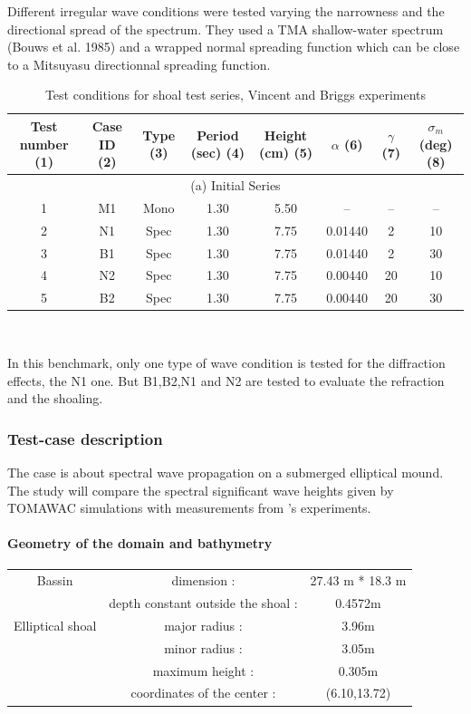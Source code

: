 Different irregular wave conditions were tested varying the narrowness and the directional spread of the spectrum. They used a TMA shallow-water spectrum (Bouws et al. 1985) and a wrapped normal spreading function which can be close to a Mitsuyasu directionnal spreading function.\\
\begin{table}

\begin{tabular}{|c|c|c|c|c|c|c|c|}
\hline
\hline
Test number (1) & Case ID (2) & Type (3) & Period (sec) (4) & Height (cm) (5) & $\alpha$ (6) & $\gamma$ (7) & $\sigma _m$ (deg) (8) \\
\hline
\multicolumn{8}{|c|}{(a) Initial Series}\\
\hline
1 & M1 & Mono & 1.30 & 5.50 & -- & -- & -- \\
2 & N1 & Spec & 1.30 & 7.75 & 0.01440 & 2 & 10\\
3 & B1 & Spec & 1.30 & 7.75 & 0.01440 & 2 & 30\\
4 & N2 & Spec & 1.30 & 7.75 & 0.00440 & 20 & 10\\
5 & B2 & Spec & 1.30 & 7.75 & 0.00440 & 20 & 30\\
\hline
\end{tabular} \\
\caption{Test conditions for shoal test series, Vincent and Briggs experiments}
\label{setupVB}
\end{table}

In this benchmark, only one type of wave condition is tested for the diffraction effects, the N1 one. But B1,B2,N1 and N2 are tested to evaluate the refraction and the shoaling.

\subsubsection{Test-case description}
The case is about spectral wave propagation on a submerged elliptical mound. The study will compare the spectral significant wave heights given by TOMAWAC simulations with measurements from \cite{vincent}'s experiments.
\paragraph{Geometry of the domain and bathymetry}

\begin{tabular}{ccc}
Bassin & dimension :& 27.43 m * 18.3 m\\
 &depth constant outside the shoal :& 0.4572m\\
Elliptical shoal & major radius :& 3.96m\\
 & minor radius :& 3.05m\\
  & maximum height :& 0.305m\\
  & coordinates of the center :& (6.10,13.72)
\end{tabular}

